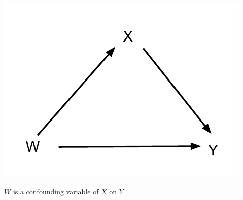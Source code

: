 \documentclass{tufte-handout}
\begin{document}
\begin{marginfigure}
\includegraphics{../lectures/images/Confounding_Variable_Diagram.pdf}
\caption{$W$ is a confounding variable of $X$ on $Y$}
\end{marginfigure}
\end{document}
